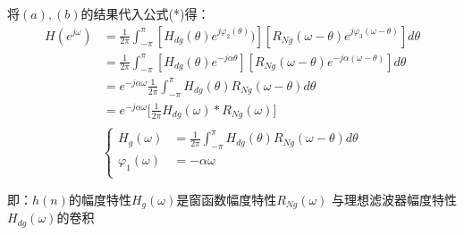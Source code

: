 \documentclass[notheorems,compress,mathserif,table]{beamer}
\begin{document}
\begin{frame}\frametitle{}%

          将$(a),(b)$的结果代入公式(*)得：
          \begin{equation*}
            \begin{split}
            H(e^{j\omega})
              &= \frac{1}{2\pi}\int_{-\pi}^{\pi}
                 \left[H_{dg}(\theta)e^{j\varphi_2(\theta)})\right]
                 \left[R_{Ng}(\omega-\theta)e^{j\varphi_3(\omega-\theta)}\right]
                 d\theta\\
              &= \frac{1}{2\pi}\int_{-\pi}^{\pi}
                 \left[H_{dg}(\theta)e^{-j\alpha\theta}\right]
                 \left[R_{Ng}(\omega-\theta)e^{-j\alpha(\omega-\theta)}\right]
                 d\theta\\
              &= e^{-j\alpha\omega}\frac{1}{2\pi}\int_{-\pi}^{\pi}
                 H_{dg}(\theta)R_{Ng}(\omega-\theta)d\theta\\
              &= e^{-j\alpha\omega}\Big[\frac{1}{2\pi} H_{dg}(\omega)\ast R_{Ng}(\omega)\Big]\\
            \end{split}
          \end{equation*}
          $$
            \left\{ \begin{aligned}
              H_g(\omega)
                    &=\frac{1}{2\pi}\int_{-\pi}^{\pi}
                 H_{dg}(\theta)R_{Ng}(\omega-\theta)d\theta \\%
              \varphi_1(\omega)
                    &=-\alpha\omega\\
            \end{aligned} \right.
          $$

          即：$h(n)$的幅度特性$H_g(\omega)$是窗函数幅度特性$R_{Ng}(\omega)$
          与理想滤波器幅度特性$H_{dg}(\omega)$的卷积

\end{frame}
\end{document}
